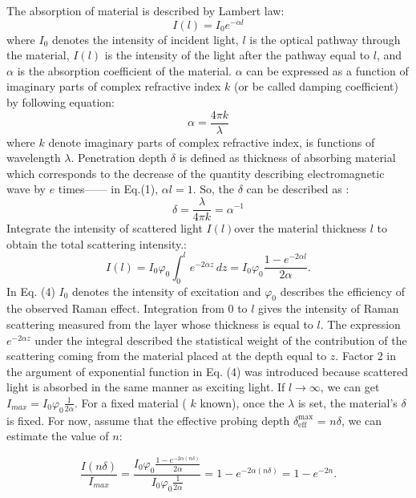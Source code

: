 \documentclass[prx,aps,twocolumn,preprintnumbers,amsmath,amssymb,superscriptaddress,showpacs]{revtex4-2}
\begin{document}
The absorption of material is described by Lambert law:
\begin{equation}
I(l) = I_0 e^{-\alpha l}
\label{eq:einstein}
\end{equation}
where $I_{0}$ denotes the intensity of incident light, $l$ is the optical  pathway through the material, $I(l)$ is the intensity of the light after the pathway equal to $l$, and $\alpha$ is the absorption coefficient of the material. $\alpha$ can be expressed as a function of imaginary parts of complex refractive index $k$ (or be called damping coefficient) by following equation: 
\begin{equation}
 \alpha = \frac{4\pi k}{\lambda}
\label{eq:einstein}
\end{equation}
where $k$ denote imaginary parts of complex refractive index, is functions of wavelength $\lambda$. Penetration depth $\delta$ is defined as thickness of absorbing material which corresponds to the decrease of the quantity describing electromagnetic wave by $e$ times——  in Eq.(1), $\alpha l=1$. So, the $\delta$ can be described as :
\begin{equation}
\delta = \frac{\lambda}{4\pi k} = \alpha^{-1}
\label{eq:einstein}
\end{equation}
Integrate the intensity of scattered light $I(l)$over the material thickness $l$ to obtain the total scattering intensity.:
\begin{equation}
I(l) = I_0 \varphi_0 \int_{0}^{l} e^{-2\alpha z} \, dz = I_0 \varphi_0 \frac{1 - e^{-2\alpha l}}{2\alpha}.
\label{eq:einstein}
\end{equation}
In Eq. (4) $I_{0}$ denotes the intensity of excitation and $\varphi_{0}$ describes the efficiency of the observed Raman effect. Integration from 0 to $l$ gives the intensity of Raman scattering measured from the layer whose thickness is equal to $l$. The expression $e^{-2\alpha z}$ under the integral described the statistical weight of the contribution of the scattering coming from the material placed at the depth equal to $z$. Factor 2 in the argument of exponential function in Eq. (4) was introduced because scattered light is absorbed in the same manner as exciting light. If $l\to \infty$, we can get $I_{max} =  I_0 \varphi_0 \frac{1 }{2\alpha}$. For a fixed material ( $k$  known), once the $\lambda$ is set, the material’s $\delta$  is fixed. For now, assume that the effective probing depth $\delta_{\text{eff}}^{\text{max}}$ = $n \delta$, we can estimate the value of $n$:  

\begin{equation}
\frac{I(n \delta)}{I_{max}}= \frac{I_0 \varphi_0 \frac{1 - e^{-2\alpha (n \delta)}}{2\alpha}}{I_0 \varphi_0 \frac{1 }{2\alpha}}=1 - e^{-2\alpha (n \delta)}=1 - e^{-2n }.
\label{eq:einstein}
\end{equation} 
\end{document}
